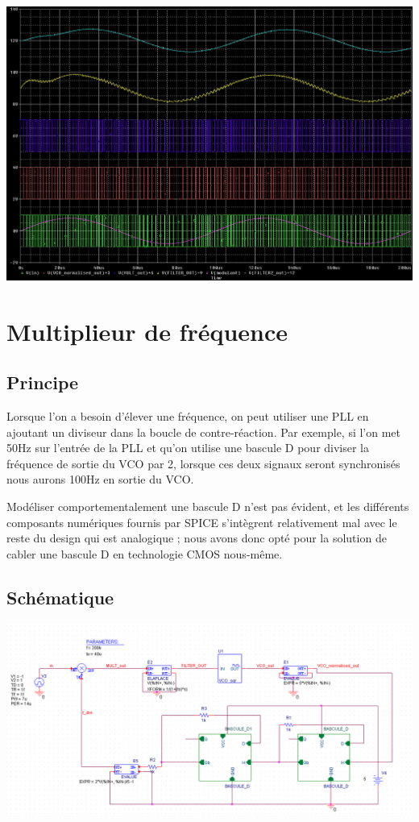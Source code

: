 \documentclass{article}
\begin{document}
\includegraphics[width=\linewidth]{modem_sim.png}

\section{Multiplieur de fréquence}

\subsection{Principe}

Lorsque l’on a besoin d’élever une fréquence, on peut utiliser une PLL en ajoutant un diviseur dans la boucle de contre-réaction. Par exemple, si l’on met 50Hz sur l’entrée de la PLL et qu’on utilise une bascule D pour diviser la fréquence de sortie du VCO par 2, lorsque ces deux signaux seront synchronisés nous aurons 100Hz en sortie du VCO.

Modéliser comportementalement une bascule D n’est pas évident, et les différents composants numériques fournis par SPICE s’intègrent relativement mal avec le reste du design qui est analogique ; nous avons donc opté pour la solution de cabler une bascule D en technologie CMOS nous-même.

\subsection{Schématique}

\includegraphics[width=\linewidth]{multi_sch.png}
\end{document}
